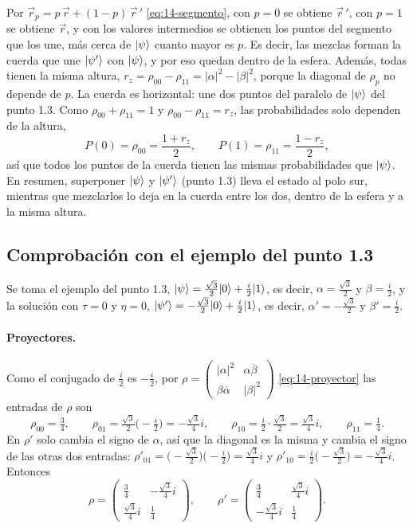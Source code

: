 Por $\vec r_p=p\,\vec r+(1-p)\,\vec r\,'$ \eqref{eq:14-segmento}, con $p=0$ se obtiene
$\vec r\,'$, con $p=1$ se obtiene $\vec r$, y con los valores intermedios se obtienen los puntos
del segmento que los une, más cerca de $\lvert \psi\rangle$ cuanto mayor es $p$. Es decir, las mezclas
forman la cuerda que une $\lvert \psi'\rangle$ con $\lvert \psi\rangle$, y por eso quedan dentro de la esfera.
Además, todas tienen la misma altura, $r_z=\rho_{00}-\rho_{11}=|\alpha|^2-|\beta|^2$, porque la
diagonal de $\rho_p$ no depende de $p$. La cuerda es horizontal: une dos puntos del paralelo de
$\lvert \psi\rangle$ del punto 1.3. Como $\rho_{00}+\rho_{11}=1$ y $\rho_{00}-\rho_{11}=r_z$, las
probabilidades solo dependen de la altura,
\[
  P(0)=\rho_{00}=\frac{1+r_z}{2},\qquad P(1)=\rho_{11}=\frac{1-r_z}{2},
\]
así que todos los puntos de la cuerda tienen las mismas probabilidades que $\lvert \psi\rangle$. En resumen,
superponer $\lvert \psi\rangle$ y $\lvert \psi'\rangle$ (punto 1.3) lleva el estado al polo sur, mientras que
mezclarlos lo deja en la cuerda entre los dos, dentro de la esfera y a la misma altura.

\subsection*{Comprobación con el ejemplo del punto 1.3}

Se toma el ejemplo del punto 1.3, $\lvert \psi\rangle=\frac{\sqrt3}{2}\lvert 0\rangle+\frac{i}{2}\lvert 1\rangle$, es decir,
$\alpha=\frac{\sqrt3}{2}$ y $\beta=\frac{i}{2}$, y la solución con $\tau=0$ y $\eta=0$,
$\lvert \psi'\rangle=-\frac{\sqrt3}{2}\lvert 0\rangle+\frac{i}{2}\lvert 1\rangle$, es decir, $\alpha'=-\frac{\sqrt3}{2}$ y
$\beta'=\frac{i}{2}$.

\paragraph{Proyectores.} Como el conjugado de $\frac{i}{2}$ es $-\frac{i}{2}$, por
$\rho=\begin{pmatrix}|\alpha|^2 & \alpha\overline\beta\\ \beta\overline\alpha & |\beta|^2\end{pmatrix}$ \eqref{eq:14-proyector} las entradas de $\rho$ son
\[
  \rho_{00}=\tfrac34,\qquad
  \rho_{01}=\tfrac{\sqrt3}{2}\bigl(-\tfrac{i}{2}\bigr)=-\tfrac{\sqrt3}{4}i,\qquad
  \rho_{10}=\tfrac{i}{2}\cdot\tfrac{\sqrt3}{2}=\tfrac{\sqrt3}{4}i,\qquad
  \rho_{11}=\tfrac14 .
\]
En $\rho'$ solo cambia el signo de $\alpha$, así que la diagonal es la misma y cambia el signo de
las otras dos entradas: $\rho'_{01}=\bigl(-\tfrac{\sqrt3}{2}\bigr)\bigl(-\tfrac{i}{2}\bigr)=\tfrac{\sqrt3}{4}i$ y
$\rho'_{10}=\tfrac{i}{2}\bigl(-\tfrac{\sqrt3}{2}\bigr)=-\tfrac{\sqrt3}{4}i$. Entonces
\[
  \rho=\begin{pmatrix}\frac34 & -\frac{\sqrt3}{4}i\\[3pt] \frac{\sqrt3}{4}i & \frac14\end{pmatrix},
  \qquad
  \rho'=\begin{pmatrix}\frac34 & \frac{\sqrt3}{4}i\\[3pt] -\frac{\sqrt3}{4}i & \frac14\end{pmatrix}.
\]


